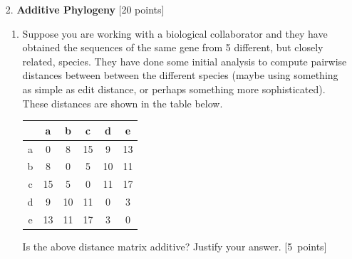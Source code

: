 \begin{enumerate}
\item[2.] \textbf{Additive Phylogeny} [20 points]

\begin{enumerate}
\item Suppose you are working with a biological collaborator and they have obtained the sequences of the same gene from 5 different, but closely related, species.  They have done some initial analysis to compute pairwise distances between between the different species (maybe using something as simple as edit distance, or perhaps something more sophisticated).  These distances are shown in the table below.  

\begin{center}
\begin{tabular}{|c|ccccc|}
\hline
& a & b & c & d &e\\
\hline
a & 0 & 8 & 15 & 9 & 13\\
b & 8 & 0 & 5 & 10 & 11\\
c & 15 & 5 & 0 & 11 & 17\\
d & 9 & 10 & 11 & 0 & 3 \\
e & 13 & 11 & 17 & 3 & 0\\
\hline
\end{tabular}
\end{center}

Is the above distance matrix additive? Justify your answer. [5~points]



\end{enumerate}
\end{enumerate}
